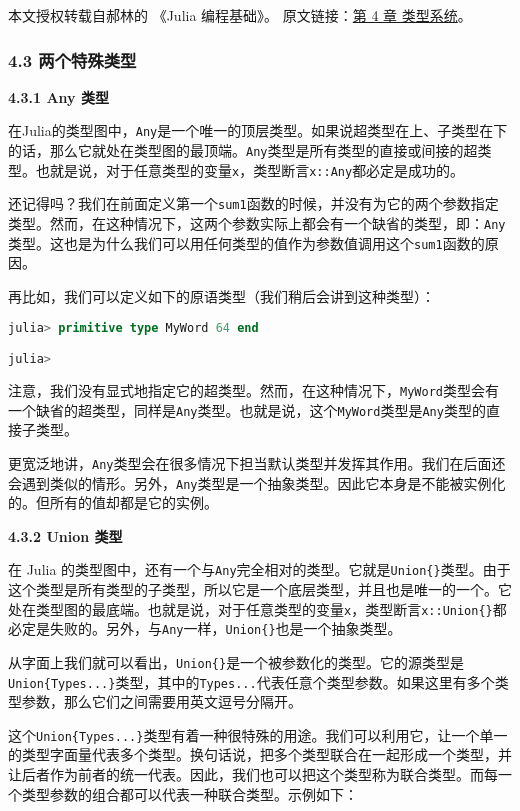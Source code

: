 
本文授权转载自郝林的 《Julia 编程基础》。 原文链接：\href{https://github.com/hyper0x/JuliaBasics/blob/master/book/ch04.md}{第 4 章 类型系统}。


\subsubsection{4.3 两个特殊类型}

\textbf{4.3.1 Any 类型}

在Julia的类型图中，\verb|Any|是一个唯一的顶层类型。如果说超类型在上、子类型在下的话，那么它就处在类型图的最顶端。\verb|Any|类型是所有类型的直接或间接的超类型。也就是说，对于任意类型的变量\verb|x|，类型断言\verb|x::Any|都必定是成功的。

还记得吗？我们在前面定义第一个\verb|sum1|函数的时候，并没有为它的两个参数指定类型。然而，在这种情况下，这两个参数实际上都会有一个缺省的类型，即：\verb|Any|类型。这也是为什么我们可以用任何类型的值作为参数值调用这个\verb|sum1|函数的原因。

再比如，我们可以定义如下的原语类型（我们稍后会讲到这种类型）：

\begin{lstlisting}[language=julia]
julia> primitive type MyWord 64 end

julia> 
\end{lstlisting}

注意，我们没有显式地指定它的超类型。然而，在这种情况下，\verb|MyWord|类型会有一个缺省的超类型，同样是\verb|Any|类型。也就是说，这个\verb|MyWord|类型是\verb|Any|类型的直接子类型。

更宽泛地讲，\verb|Any|类型会在很多情况下担当默认类型并发挥其作用。我们在后面还会遇到类似的情形。另外，\verb|Any|类型是一个抽象类型。因此它本身是不能被实例化的。但所有的值却都是它的实例。

\textbf{4.3.2 Union{} 类型}

在 Julia 的类型图中，还有一个与\verb|Any|完全相对的类型。它就是\verb|Union{}|类型。由于这个类型是所有类型的子类型，所以它是一个底层类型，并且也是唯一的一个。它处在类型图的最底端。也就是说，对于任意类型的变量\verb|x|，类型断言\verb|x::Union{}|都必定是失败的。另外，与\verb|Any|一样，\verb|Union{}|也是一个抽象类型。

从字面上我们就可以看出，\verb|Union{}|是一个被参数化的类型。它的源类型是\verb|Union{Types...}|类型，其中的\verb|Types...|代表任意个类型参数。如果这里有多个类型参数，那么它们之间需要用英文逗号分隔开。

这个\verb|Union{Types...}|类型有着一种很特殊的用途。我们可以利用它，让一个单一的类型字面量代表多个类型。换句话说，把多个类型联合在一起形成一个类型，并让后者作为前者的统一代表。因此，我们也可以把这个类型称为联合类型。而每一个类型参数的组合都可以代表一种联合类型。示例如下：

